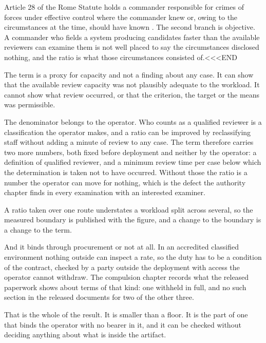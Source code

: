 Article 28 of the Rome Statute holds a commander responsible for crimes of forces under effective control where the commander knew or, owing to the circumstances at the time, should have known \autocite{icc1998rome}. The second branch is objective. A commander who fields a system producing candidates faster than the available reviewers can examine them is not well placed to say the circumstances disclosed nothing, and the ratio is what those circumstances consisted of.<<<END


The term is a proxy for capacity and not a finding about any case. It can show that the available review capacity was not plausibly adequate to the workload. It cannot show what review occurred, or that the criterion, the target or the means was permissible.

The denominator belongs to the operator. Who counts as a qualified reviewer is a classification the operator makes, and a ratio can be improved by reclassifying staff without adding a minute of review to any case. The term therefore carries two more numbers, both fixed before deployment and neither by the operator: a definition of qualified reviewer, and a minimum review time per case below which the determination is taken not to have occurred. Without those the ratio is a number the operator can move for nothing, which is the defect the authority chapter finds in every examination with an interested examiner.

A ratio taken over one route understates a workload split across several, so the measured boundary is published with the figure, and a change to the boundary is a change to the term.

And it binds through procurement or not at all. In an accredited classified environment nothing outside can inspect a rate, so the duty has to be a condition of the contract, checked by a party outside the deployment with access the operator cannot withdraw. The compulsion chapter records what the released paperwork shows about terms of that kind: one withheld in full, and no such section in the released documents for two of the other three.

That is the whole of the result. It is smaller than a floor. It is the part of one that binds the operator with no bearer in it, and it can be checked without deciding anything about what is inside the artifact.
